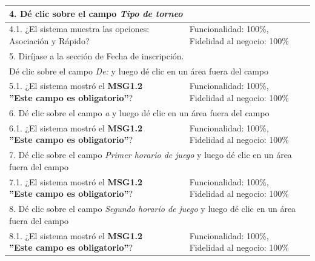 \documentclass[oneside,10pt]{book}
\begin{document}
\begin{tabularx}{\textwidth}{ X l l X }
\multicolumn{4}{|l|}{4. Dé clic sobre el campo \textit{Tipo de torneo} }              \\ \hline
\multicolumn{1}{|X|}{4.1. ¿El sistema muestra las opciones: Asociación y Rápido?} & \multicolumn{1}{l|}{}   & \multicolumn{1}{l|}{}   & \multicolumn{1}{X|}{Funcionalidad: 100\%, Fidelidad al negocio: 100\%}              \\ \hline

\multicolumn{4}{|l|}{5. Diríjase a la sección de Fecha de inscripción. }               \\ \hline
\multicolumn{4}{|l|}{Dé clic sobre el campo \textit{De:} y luego dé clic en un área fuera del campo} \\ \hline
\multicolumn{1}{|X|}{5.1. ¿El sistema mostró el \textbf{MSG1.2 ''Este campo es obligatorio''}?} & \multicolumn{1}{l|}{}   & \multicolumn{1}{l|}{}   & \multicolumn{1}{X|}{Funcionalidad: 100\%, Fidelidad al negocio: 100\%}              \\ \hline

\multicolumn{4}{|l|}{6. Dé clic sobre el campo \textit{a} y luego dé clic en un área fuera del campo} \\ \hline
\multicolumn{1}{|X|}{6.1. ¿El sistema mostró el \textbf{MSG1.2 ''Este campo es obligatorio''}?} & \multicolumn{1}{l|}{}   & \multicolumn{1}{l|}{}   & \multicolumn{1}{X|}{Funcionalidad: 100\%, Fidelidad al negocio: 100\%}              \\ \hline

\multicolumn{4}{|l|}{7. Dé clic sobre el campo \textit{Primer horario de juego} y luego dé clic en un área fuera del campo} \\ \hline
\multicolumn{1}{|X|}{7.1. ¿El sistema mostró el \textbf{MSG1.2 ''Este campo es obligatorio''}?} & \multicolumn{1}{l|}{}   & \multicolumn{1}{l|}{}   & \multicolumn{1}{X|}{Funcionalidad: 100\%, Fidelidad al negocio: 100\%}              \\ \hline

\multicolumn{4}{|l|}{8. Dé clic sobre el campo \textit{Segundo horario de juego} y luego dé clic en un área fuera del campo} \\ \hline
\multicolumn{1}{|X|}{8.1. ¿El sistema mostró el \textbf{MSG1.2 ''Este campo es obligatorio''}?} & \multicolumn{1}{l|}{}   & \multicolumn{1}{l|}{}   & \multicolumn{1}{X|}{Funcionalidad: 100\%, Fidelidad al negocio: 100\%}              \\ \hline

\end{tabularx}
\end{document}

